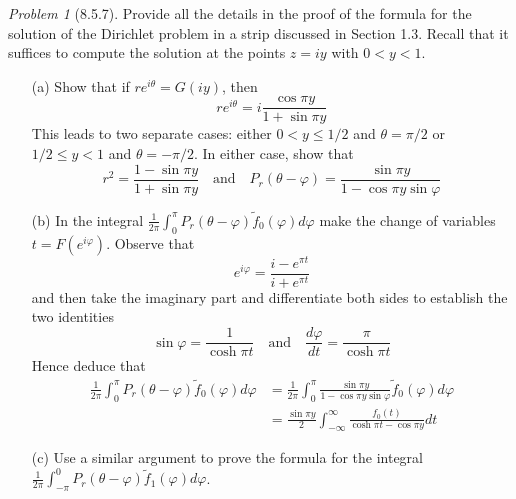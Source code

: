 \documentclass[10pt]{article}
\newcommand{\wt}[1]{\widetilde{#1}}
\theoremstyle{remark}
\newtheorem{problem}{Problem}
\theoremstyle{remark}
\begin{document}
\begin{problem}[8.5.7]
  Provide all the details in the proof of the formula for the solution of
  the Dirichlet problem in a strip discussed in Section 1.3. Recall that
  it suffices to compute the solution at the points $z=iy$ with $0<y<1$.
  \begin{enumerate}
  \item[(a)] Show that if $re^{i\theta}=G(iy)$, then
    \[
      re^{i\theta}=i\frac{\cos\pi y}{1+\sin\pi y}
    \]
    This leads to two separate cases: either $0<y\leq 1/2$ and $\theta=\pi/2$
    or $1/2\leq y<1$ and $\theta=-\pi/2$. In either case, show that
    \[
      r^2=\frac{1-\sin\pi y}{1+\sin\pi y}\quad \text{and}\quad P_r(\theta-\varphi)=\frac{\sin\pi y}{1-\cos\pi y\sin\varphi}
    \]
  \item[(b)] In the integral
    $\frac{1}{2\pi}\int_0^\pi P_r(\theta-\varphi)\wt{f}_0(\varphi)d\varphi$
    make the change of variables $t=F(e^{i\varphi})$. Observe that
    \[
      e^{i\varphi}=\frac{i-e^{\pi t}}{i+e^{\pi t}}
    \]
    and then take the imaginary part and differentiate both sides to establish
    the two identities
    \[
      \sin\varphi = \frac{1}{\cosh \pi t}\quad \text{and}\quad \frac{d\varphi}{dt}=\frac{\pi}{\cosh\pi t}
    \]
    Hence deduce that
    \begin{align*}
      \frac{1}{2\pi}\int_0^\pi P_r(\theta-\varphi)\wt{f}_0(\varphi)d\varphi &=\frac{1}{2\pi}\int_0^\pi\frac{\sin\pi y}{1-\cos\pi y\sin\varphi}\wt{f}_0(\varphi)d\varphi\\
                                             &=\frac{\sin\pi y}{2}\int_{-\infty}^\infty\frac{f_0(t)}{\cosh\pi t-\cos\pi y}dt
    \end{align*}
  \item[(c)] Use a similar argument to prove the formula for the integral
    $\frac{1}{2\pi}\int_{-\pi}^0 P_r(\theta-\varphi)\wt{f}_1(\varphi)d\varphi$.
  \end{enumerate}
\end{problem}
\end{document}
